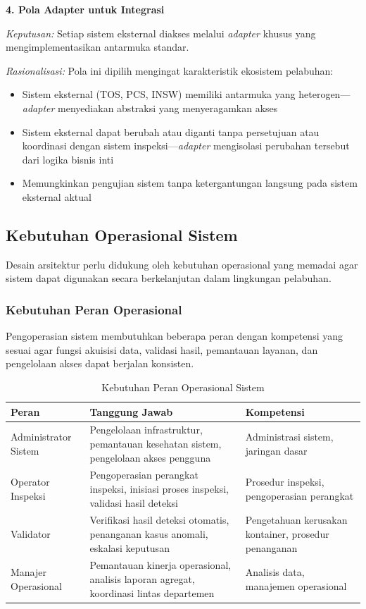 \textbf{4. Pola Adapter untuk Integrasi}

\textit{Keputusan:} Setiap sistem eksternal diakses melalui \textit{adapter} khusus yang mengimplementasikan antarmuka standar.

\textit{Rasionalisasi:} Pola ini dipilih mengingat karakteristik ekosistem pelabuhan:
\begin{itemize}
  \item Sistem eksternal (TOS, PCS, INSW) memiliki antarmuka yang heterogen---\textit{adapter} menyediakan abstraksi yang menyeragamkan akses
  \item Sistem eksternal dapat berubah atau diganti tanpa persetujuan atau koordinasi dengan sistem inspeksi---\textit{adapter} mengisolasi perubahan tersebut dari logika bisnis inti
  \item Memungkinkan pengujian sistem tanpa ketergantungan langsung pada sistem eksternal aktual
\end{itemize}

\subsection{Kebutuhan Operasional Sistem}

Desain arsitektur perlu didukung oleh kebutuhan operasional yang memadai agar
sistem dapat digunakan secara berkelanjutan dalam lingkungan pelabuhan.

\subsubsection{Kebutuhan Peran Operasional}

Pengoperasian sistem membutuhkan beberapa peran dengan kompetensi yang sesuai
agar fungsi akuisisi data, validasi hasil, pemantauan layanan, dan pengelolaan
akses dapat berjalan konsisten.

\begin{table}[ht]
  \centering
  \small
  \caption{Kebutuhan Peran Operasional Sistem}
  \label{tbl:kebutuhan_peran}
  \begin{tabular}{p{} p{} p{}}
    \toprule
    \textbf{Peran} & \textbf{Tanggung Jawab} & \textbf{Kompetensi} \\
    \midrule
    Administrator Sistem & Pengelolaan infrastruktur, pemantauan kesehatan sistem, pengelolaan akses pengguna & Administrasi sistem, jaringan dasar \\
    Operator Inspeksi & Pengoperasian perangkat inspeksi, inisiasi proses inspeksi, validasi hasil deteksi & Prosedur inspeksi, pengoperasian perangkat \\
    Validator & Verifikasi hasil deteksi otomatis, penanganan kasus anomali, eskalasi keputusan & Pengetahuan kerusakan kontainer, prosedur penanganan \\
    Manajer Operasional & Pemantauan kinerja operasional, analisis laporan agregat, koordinasi lintas departemen & Analisis data, manajemen operasional \\
    \bottomrule
  \end{tabular}
\end{table}

